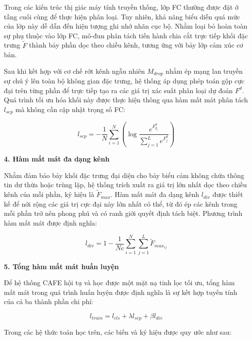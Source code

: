 Trong các kiến trúc thị giác máy tính truyền thống, lớp FC thường được đặt ở tầng cuối cùng để thực hiện phân loại. Tuy nhiên, khả năng biểu diễn quá mức của lớp này dễ dẫn đến hiện tượng ghi nhớ nhãn cục bộ. Nhằm loại bỏ hoàn toàn sự phụ thuộc vào lớp FC, mô-đun phân tách tiến hành chia cắt trực tiếp khối đặc trưng $\tilde{F}$ thành bảy phần dọc theo chiều kênh, tương ứng với bảy lớp cảm xúc cơ bản.

Sau khi kết hợp với cơ chế rớt kênh ngẫu nhiên $M_{drop}$ nhằm ép mạng lan truyền sự chú ý lên toàn bộ không gian đặc trưng, hệ thống áp dụng phép toán gộp cực đại trên từng phần để trực tiếp tạo ra các giá trị xác suất phân loại dự đoán $F^d$. Quá trình tối ưu hóa khối này được thực hiện thông qua hàm mất mát phân tách $l_{sep}$ mà không cần cập nhật trọng số FC:

\begin{equation}
    l_{sep} = -\frac{1}{N} \sum_{i=1}^N \left( \log \frac{e^{F^d_{y_i}}}{\sum_{j=1}^L e^{F^d_j}} \right)
\end{equation}

\textbf{4. Hàm mất mát đa dạng kênh}

Nhằm đảm bảo bảy khối đặc trưng đại diện cho bảy biểu cảm không chứa thông tin dư thừa hoặc trùng lặp, hệ thống trích xuất ra giá trị lớn nhất dọc theo chiều kênh của mỗi phần, ký hiệu là $\tilde{F}_{max}$. Hàm mất mát đa dạng kênh $l_{div}$ được thiết kế để nới rộng các giá trị cực đại này lớn nhất có thể, từ đó ép các kênh trong mỗi phần trở nên phong phú và có ranh giới quyết định tách biệt. Phương trình hàm mất mát được định nghĩa:

\begin{equation}
    l_{div} = 1 - \frac{1}{Nc} \sum_{i=1}^N \sum_{j=1}^L \tilde{F}_{max_{ij}}
\end{equation}

\textbf{5. Tổng hàm mất mát huấn luyện}

Để hệ thống CAFE hội tụ và học được một mặt nạ tinh lọc tối ưu, tổng hàm mất mát trong quá trình huấn luyện được định nghĩa là sự kết hợp tuyến tính của cả ba thành phần chi phí:

\begin{equation}
    l_{train} = l_{cls} + \lambda l_{sep} + \beta l_{div}
\end{equation}

Trong các hệ thức toán học trên, các biến và ký hiệu được quy ước như sau:

